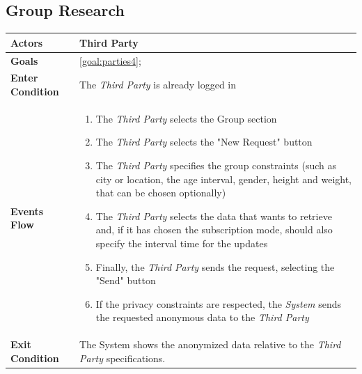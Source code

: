   \subsection{Group Research}


\begin{table}[H]
	\centering
    
    \begin{tabular}{|p{3.5cm}|p{10.3cm}|}
    
    \hline
    \textbf{\large{Actors}}  			& \tabitem Third Party 																\\
    \hline
    \textbf{\large{Goals}} 				& \ref{goal:parties4};\\
    
    \hline
    \textbf{\large{Enter Condition}}	& The \emph{Third Party} is already logged in	\\
    
    \hline
    \textbf{\large{Events Flow}}		& \begin{enumerate}[leftmargin=0.5cm]
                                \item The \emph{Third Party} selects the Group section
                                \item The \emph{Third Party} selects the "New Request" button
                                \item The \emph{Third Party} specifies the group constraints (such as city or location, the age interval, gender, height and weight, that can be chosen optionally)
                                 \item The \emph{Third Party} selects the data that wants to retrieve and, if it has chosen the subscription mode, should also specify the interval time for the updates
                                 \item Finally, the \emph{Third Party} sends the request, selecting the "Send" button
                                 \item If the privacy constraints are respected, the \emph{System} sends the requested anonymous data to the \emph{Third Party}
                                           
                                          \end{enumerate}
    										\\
    \hline
    \textbf{\large{Exit Condition}} 	& The System shows the                                     anonymized data relative to the                                    \emph{Third Party} specifications. \\
    

\end{tabular}
\end{table}
